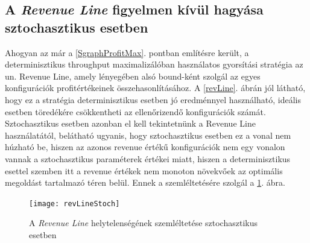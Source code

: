 \subsection{A \textit{Revenue Line} figyelmen kívül hagyása sztochasztikus esetben}
Ahogyan az már a \ref{SgraphProfitMax}. pontban említésre került, a determinisztikus throughput maximalizálóban használatos gyorsítási stratégia az un. Revenue Line, amely lényegében alsó bound-ként szolgál az egyes konfigurációk profitértékeinek összehasonlításához.
A \ref{revLine}. ábrán jól látható, hogy ez a stratégia determinisztikus esetben jó eredménnyel használható, ideális esetben töredékére csökkentheti az ellenőrizendő konfigurációk számát.
Sztochasztikus esetben azonban el kell tekintetnünk a Revenue Line használatától, belátható ugyanis, hogy sztochasztikus esetben ez a vonal nem húzható be, hiszen az azonos revenue értékű konfigurációk nem egy vonalon vannak a sztochasztikus paraméterek értékei miatt, hiszen a determinisztikus esettel szemben itt a revenue értékek nem monoton növekvőek az optimális megoldást tartalmazó téren belül.
Ennek a szemléltetésére szolgál a \ref{revLineStoch}. ábra.
\begin{figure}[H]
\begin{center}
\texttt{[image: revLineStoch]}
\caption{A \textit{Revenue Line} helytelenségének szemléltetése sztochasztikus esetben}
\label{revLineStoch}
\end{center}
\end{figure} 
